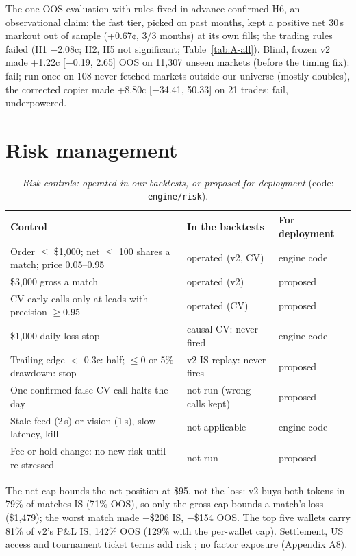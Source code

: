\documentclass[11pt,letterpaper]{article}
\begin{document}
 The one OOS evaluation with rules fixed in advance
confirmed H6, an observational claim: the fast tier, picked on past months, kept a positive net 30\,s markout out of sample
(+0.67¢, 3/3 months) at its own fills; the trading rules failed
(H1 −2.08¢; H2, H5 not significant; Table~\ref{tab:A-all}). Blind, frozen v2 made +1.22¢ [−0.19, 2.65] OOS on
11,307 unseen markets (before the timing fix): fail; run once on
108 never-fetched markets outside our universe (mostly doubles), the corrected copier made
+8.80¢ [−34.41, 50.33] on 21 trades: fail, underpowered.

\section{Risk management}\label{sec:risk}
\begin{table}[t]
\caption{\emph{Risk controls: operated in our backtests, or proposed for deployment} (code: \texttt{engine/risk}).}
\label{tab:risk}
\tabnums\setlength\tabcolsep{3pt}\renewcommand{}
\begin{tabular*}{\textwidth}{@{\extracolsep{\fill}}lll@{}}
\toprule
Control & In the backtests & For deployment \\
\midrule
Order \(\leq\) \$1,000; net \(\leq\) 100 shares a match; price 0.05–0.95 & operated (v2, CV) & engine code \\
\$3,000 gross a match & operated (v2) & proposed \\
CV early calls only at leads with precision \(\geq\)0.95 & operated (CV) & proposed \\
\$1,000 daily loss stop & causal CV: never fired & engine code \\
Trailing edge \(<\) 0.3¢: half; \(\leq 0\) or 5\% drawdown: stop & v2 IS replay: never fires & proposed \\
One confirmed false CV call halts the day & not run (wrong calls kept) & proposed \\
Stale feed (2\,s) or vision (1\,s), slow latency, kill & not applicable & engine code \\
Fee or hold change: no new risk until re-stressed & not run & proposed \\
\bottomrule
\end{tabular*}
\end{table}

 The net cap bounds the net position at \$95, not the loss:
v2 buys both tokens in 79\% of matches IS (71\% OOS), so only the
gross cap bounds a match's loss (\$1,479); the worst match made −\$206 IS,
−\$154 OOS. The top five wallets carry 81\% of v2's P\&L IS, 142\%
OOS (129\% with the per-wallet cap). Settlement, US access and tournament ticket terms add risk
\citep{pmuma,pmgeoblock,itf2026}; no factor exposure (Appendix A8).
\end{document}
